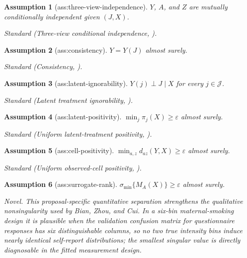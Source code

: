 \documentclass{article}
\newtheorem{assumption}{Assumption}
\begin{document}
\begin{assumption}[ass:three-view-independence]\label{ass:three-view-independence}
\(Y\), \(A\), and \(Z\) are mutually conditionally independent given \((J,X)\).
\par\smallskip\noindent\emph{Standard} (Three-view conditional independence, \cite{AllmanMatiasRhodes2009}).
\end{assumption}

\begin{assumption}[ass:consistency]\label{ass:consistency}
\(Y=Y(J)\) almost surely.
\par\smallskip\noindent\emph{Standard} (Consistency, \cite{ZhouTchetgenTchetgen2026}).
\end{assumption}

\begin{assumption}[ass:latent-ignorability]\label{ass:latent-ignorability}
\(Y(j)\perp J\mid X\) for every \(j\in\mathcal J\).
\par\smallskip\noindent\emph{Standard} (Latent treatment ignorability, \cite{ZhouTchetgenTchetgen2026}).
\end{assumption}

\begin{assumption}[ass:latent-positivity]\label{ass:latent-positivity}
\(\min_{j}\pi_j(X)\geq\varepsilon\) almost surely.
\par\smallskip\noindent\emph{Standard} (Uniform latent-treatment positivity, \cite{ZhouTchetgenTchetgen2026}).
\end{assumption}

\begin{assumption}[ass:cell-positivity]\label{ass:cell-positivity}
\(\min_{a,z}d_{az}(Y,X)\geq\varepsilon\) almost surely.
\par\smallskip\noindent\emph{Standard} (Uniform observed-cell positivity, \cite{ZhouTchetgenTchetgen2026}).
\end{assumption}

\begin{assumption}[ass:surrogate-rank]\label{ass:surrogate-rank}
\(\sigma_{\min}\{M_A(X)\}\geq\varepsilon\) almost surely.
\par\smallskip\noindent\emph{Novel.} This proposal-specific quantitative separation strengthens the qualitative nonsingularity used by Bian, Zhou, and Cui. In a six-bin maternal-smoking design it is plausible when the validation confusion matrix for questionnaire responses has six distinguishable columns, so no two true intensity bins induce nearly identical self-report distributions; the smallest singular value is directly diagnosable in the fitted measurement design.
\end{assumption}
\end{document}
